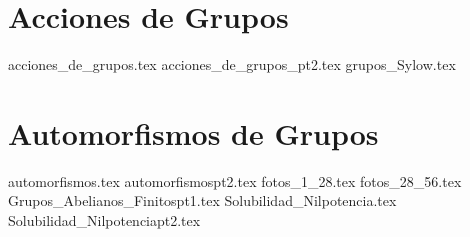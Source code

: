 \documentclass[12pt,letterpaper, twoside]{book}
\numberwithin{figure}{section}
\numberwithin{equation}{section}
\begin{document}
\chapter{Acciones de Grupos}
{acciones_de_grupos.tex}
{acciones_de_grupos_pt2.tex}
{grupos_Sylow.tex}

\chapter{Automorfismos de Grupos}
{automorfismos.tex}
{automorfismospt2.tex}
{fotos_1_28.tex}
{fotos_28_56.tex}
{Grupos_Abelianos_Finitospt1.tex}
{Solubilidad_Nilpotencia.tex}
{Solubilidad_Nilpotenciapt2.tex}
\end{document}
